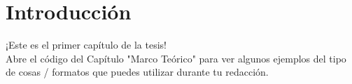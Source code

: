 
\chapter{Introducción} %

\label{Cap_Intro} %


\newcommand{\keyword}[1]{\textbf{#1}}
\newcommand{\tabhead}[1]{\textbf{#1}}
\newcommand{\code}[1]{\texttt{#1}}
\newcommand{\file}[1]{\texttt{\bfseries#1}}
\newcommand{\option}[1]{\texttt{\itshape#1}}


¡Este es el primer capítulo de la tesis!\\  %

Abre el código del Capítulo "Marco Teórico" para ver algunos ejemplos del tipo de cosas / formatos que puedes utilizar durante tu redacción.\\